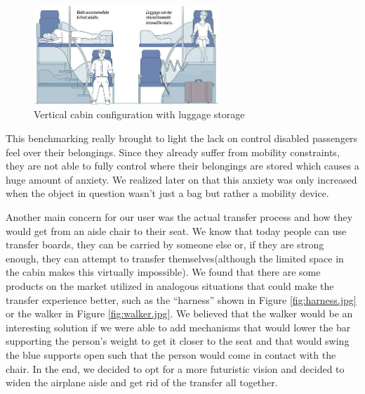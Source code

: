 \begin{figure}[h]
  \centering
     \includegraphics[width=7cm]{images/vertical_with_luggage.jpg}
   \caption{Vertical cabin configuration with luggage storage} %
  \label{fig:vertical_with_luggage.jpg}
\end{figure} 

This benchmarking really brought to light the lack on control disabled passengers feel over their belongings. Since they already suffer from mobility constraints, they are not able to fully control where their belongings are stored which causes a huge amount of anxiety. We realized later on that this anxiety was only increased when the object in question wasn't just a bag but rather a mobility device. 


Another main concern for our user was the actual transfer process and how they would get from an aisle chair to their seat. We know that today people can use transfer boards, they can be carried by someone else or, if they are strong enough, they can attempt to transfer themselves(although the limited space in the cabin makes this virtually  impossible). We found that there are some products on the market utilized in analogous situations that could make the transfer experience better, such as the “harness” shown in Figure \ref{fig:harness.jpg} or the walker in Figure \ref{fig:walker.jpg}. We believed that the walker would be an interesting solution if we were able to add mechanisms that would lower the bar supporting the person’s weight to get it closer to the seat and that would swing the blue supports open such that the person would come in contact with the chair. In the end, we decided to opt for a more futuristic vision and decided to widen the airplane aisle and get rid of the transfer all together. 

